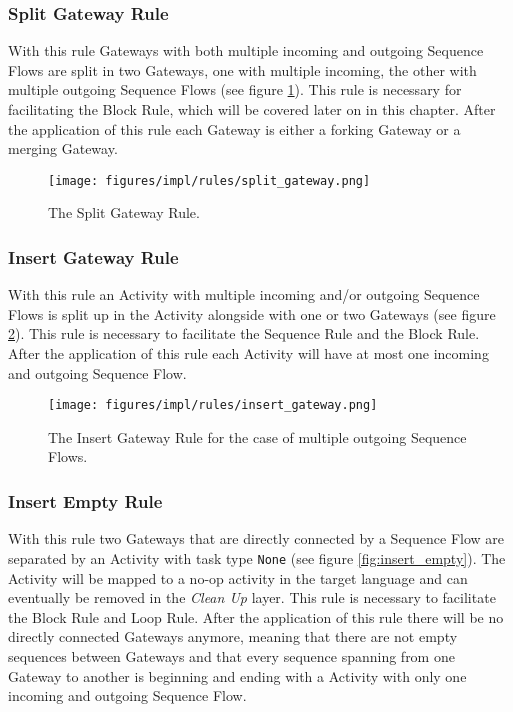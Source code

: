 \subsubsection*{Split Gateway Rule}
With this rule Gateways with both multiple incoming and outgoing Sequence Flows are split in two Gateways, one with multiple incoming, the other with multiple outgoing Sequence Flows (see figure \ref{fig:split_gateway}). This rule is necessary for facilitating the Block Rule, which will be covered later on in this chapter. After the application of this rule each Gateway is either a forking Gateway or a merging Gateway.

\begin{figure}[htp]
	\centering
	\texttt{[image: figures/impl/rules/split\_gateway.png]}
	\caption[Split Gateway Rule]{The Split Gateway Rule.}
	\label{fig:split_gateway}
\end{figure}

\subsubsection*{Insert Gateway Rule}
With this rule an Activity with multiple incoming and/or outgoing Sequence Flows is split up in the Activity alongside with one or two Gateways (see figure \ref{fig:insert_gateway}). This rule is necessary to facilitate the Sequence Rule and the Block Rule. After the application of this rule each Activity will have at most one incoming and outgoing Sequence Flow.

\begin{figure}[htp]
	\centering
	\texttt{[image: figures/impl/rules/insert\_gateway.png]}
	\caption[Insert Gateway Rule]{The Insert Gateway Rule for the case of multiple outgoing Sequence Flows.}
	\label{fig:insert_gateway}
\end{figure}

\subsubsection*{Insert Empty Rule}
With this rule two Gateways that are directly connected by a Sequence Flow are separated by an Activity with task type \verb|None| (see figure \ref{fig:insert_empty}). The Activity will be mapped to a no-op activity in the target language and can eventually be removed in the \emph{Clean Up} layer. This rule is necessary to facilitate the Block Rule and Loop Rule. After the application of this rule there will be no directly connected Gateways anymore, meaning that there are not empty sequences between Gateways and that every sequence spanning from one Gateway to another is beginning and ending with a Activity with only one incoming and outgoing Sequence Flow.

